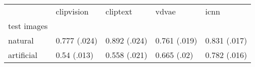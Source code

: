 \begin{tabular}{lllll}
\toprule
 & clipvision & cliptext & vdvae & icnn \\
test images &  &  &  &  \\
\midrule
natural & 0.777 (.024) & 0.892 (.024) & 0.761 (.019) & 0.831 (.017) \\
artificial & 0.54 (.013) & 0.558 (.021) & 0.665 (.02) & 0.782 (.016) \\
\bottomrule
\end{tabular}
